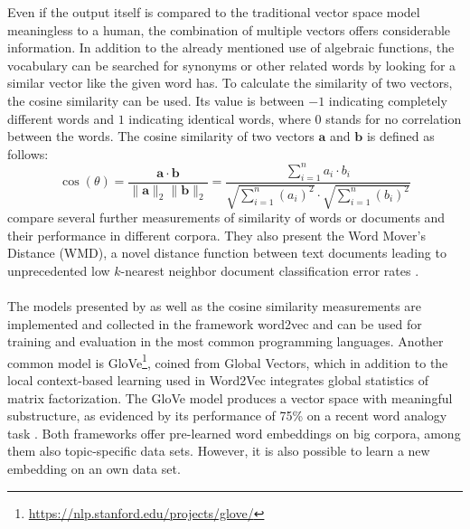 \documentclass[article,type=msc,colorback,accentcolor=tud7b]{tudthesis}
\begin{document}
    Even if the output itself is compared to the traditional vector space model meaningless to a human, the combination of multiple vectors offers considerable information. In addition to the already mentioned use of algebraic functions, the vocabulary can be searched for synonyms or other related words by looking for a similar vector like the given word has. To calculate the similarity of two vectors, the cosine similarity can be used. Its value is between $-1$ indicating completely different words and $1$ indicating identical words, where $0$ stands for no correlation between the words. The cosine similarity of two vectors $\mathbf{a}$ and $\mathbf{b}$ is defined as follows:
    \[\cos (\theta)=\frac{\mathbf{a} \cdot \mathbf{b}}{\|\mathbf{a}\|_{2}\|\mathbf{b}\|_{2}}=\frac{\sum_{i=1}^{n} a_{i} \cdot b_{i}}{\sqrt{\sum_{i=1}^{n}\left(a_{i}\right)^{2}} \cdot \sqrt{\sum_{i=1}^{n}\left(b_{i}\right)^{2}}}\]
    \citeauthor{Kusner2015} compare several further measurements of similarity of words or documents and their performance in different corpora. They also present the Word Mover’s Distance (WMD), a novel distance function between text documents leading to unprecedented low $k$-nearest neighbor document classification error rates \autocite{Kusner2015}. \\\\
    The models presented by \citeauthor{Mikolov2013} as well as the cosine similarity measurements are implemented and collected in the framework word2vec and can be used for training and evaluation in the most common programming languages. Another common model is GloVe\footnote{\url{https://nlp.stanford.edu/projects/glove/}}, coined from Global Vectors, which in addition to the local context-based learning used in Word2Vec integrates global statistics of matrix factorization. The GloVe model produces a vector space with meaningful substructure, as evidenced by its performance of 75\% on a recent word analogy task \autocite{Pennington2014}. Both frameworks offer pre-learned word embeddings on big corpora, among them also topic-specific data sets. However, it is also possible to learn a new embedding on an own data set.
  \clearpage
  
\end{document}

